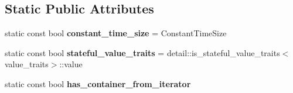 \subsection*{Static Public Attributes}
\begin{DoxyCompactItemize}
\item 
\mbox{\label{classboost_1_1intrusive_1_1list__impl_a874f994ae317f397c2d085b4bd046026}} 
static const bool {\bfseries constant\+\_\+time\+\_\+size} = Constant\+Time\+Size
\item 
\mbox{\label{classboost_1_1intrusive_1_1list__impl_ab2af39c13da3c2bd169d47f39d501a26}} 
static const bool {\bfseries stateful\+\_\+value\+\_\+traits} = detail\+::is\+\_\+stateful\+\_\+value\+\_\+traits$<$value\+\_\+traits$>$\+::value
\item 
static const bool {\bfseries has\+\_\+container\+\_\+from\+\_\+iterator}
\end{DoxyCompactItemize}
